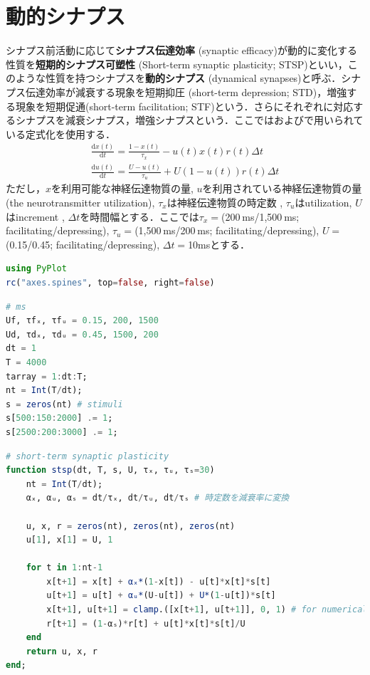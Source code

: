 \section{動的シナプス}
シナプス前活動に応じて\textbf{シナプス伝達効率} (synaptic efficacy)が動的に変化する性質を\textbf{短期的シナプス可塑性} (Short-term synaptic plasticity; STSP)といい，このような性質を持つシナプスを\textbf{動的シナプス} (dynamical synapses)と呼ぶ．シナプス伝達効率が減衰する現象を短期抑圧 (short-term depression; STD)，増強する現象を短期促通(short-term facilitation; STF)という．さらにそれぞれに対応するシナプスを減衰シナプス，増強シナプスという．ここでは\citep{Mongillo2008-kk}および\citep{Orhan2019-rq}で用いられている定式化を使用する．
\begin{align}
\frac{\mathrm{d} x(t)}{\mathrm{d} t}=\frac{1-x(t)}{\tau_{x}}-u(t) x(t) r(t) \Delta t \\
\frac{\mathrm{d} u(t)}{\mathrm{d} t}=\frac{U-u(t)}{\tau_{u}}+U(1-u(t)) r(t) \Delta t
\end{align}
ただし，$x$を利用可能な神経伝達物質の量, $u$を利用されている神経伝達物質の量(the neurotransmitter utilization), $\tau_x$は神経伝達物質の時定数 , $\tau_u$はutilization, $U$はincrement , $\Delta t$を時間幅とする．ここでは$\tau_x=$(200 ms/1,500 ms; facilitating/depressing),  $\tau_u=$(1,500 ms/200 ms; facilitating/depressing), $U=$(0.15/0.45; facilitating/depressing), $\Delta t=$10msとする．
\begin{lstlisting}[language=julia]
using PyPlot
rc("axes.spines", top=false, right=false)
\end{lstlisting}
\begin{lstlisting}[language=julia]
# ms
Uf, τfₓ, τfᵤ = 0.15, 200, 1500
Ud, τdₓ, τdᵤ = 0.45, 1500, 200
dt = 1
T = 4000
tarray = 1:dt:T;
nt = Int(T/dt);
s = zeros(nt) # stimuli
s[500:150:2000] .= 1;
s[2500:200:3000] .= 1;
\end{lstlisting}
\begin{lstlisting}[language=julia]
# short-term synaptic plasticity
function stsp(dt, T, s, U, τₓ, τᵤ, τₛ=30)
    nt = Int(T/dt);
    αₓ, αᵤ, αₛ = dt/τₓ, dt/τᵤ, dt/τₛ # 時定数を減衰率に変換

    u, x, r = zeros(nt), zeros(nt), zeros(nt)
    u[1], x[1] = U, 1
    
    for t in 1:nt-1
        x[t+1] = x[t] + αₓ*(1-x[t]) - u[t]*x[t]*s[t]
        u[t+1] = u[t] + αᵤ*(U-u[t]) + U*(1-u[t])*s[t]
        x[t+1], u[t+1] = clamp.([x[t+1], u[t+1]], 0, 1) # for numerical stability
        r[t+1] = (1-αₛ)*r[t] + u[t]*x[t]*s[t]/U
    end
    return u, x, r
end;
\end{lstlisting}
